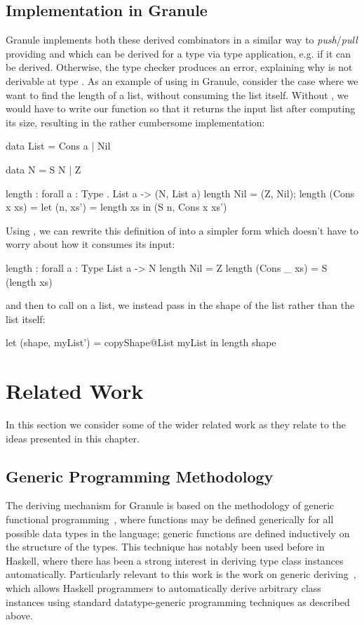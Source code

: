 \subsection{Implementation in Granule}
Granule implements both these derived combinators in a similar way to
\emph{push}/\emph{pull} providing  and  which can
be derived for a type  via type application, e.g.  if it can be derived. Otherwise, the type checker produces an error,
explaining why  is not derivable at type . As an example
of using  in Granule, consider the case where we want to find
the length of a list, without consuming the list itself. Without , 
we would have to write our  function so that it returns the input list
after computing its size, resulting in the rather cumbersome implementation:
\begin{granule}
data List = Cons a | Nil 

data N = S N | Z

length : forall { a : Type } . List a -> (N, List a)
length Nil = (Z, Nil);
length (Cons x xs) = 
  let (n, xs') = length xs in (S n, Cons x xs')
\end{granule}
Using , we can rewrite this definition of  into
a simpler form which doesn't have to worry about how it consumes its input:
\begin{granule}
length : forall { a : Type } List a -> N
length Nil = Z
length (Cons _ xs) = S (length xs)
\end{granule}
and then to call  on a list, we instead pass in the shape of the 
list rather than the list itself:
\begin{granule}
let (shape, myList') = copyShape@List myList in length shape
\end{granule}

\section{Related Work}
\label{sec:deriving-related}
In this section we consider some of the wider related work as they relate to the
ideas presented in this chapter.
\subsection{Generic Programming Methodology}
The deriving mechanism for Granule is based on the methodology of generic
functional programming~\citep{hinze2000new}, where functions may be defined
generically for all possible data types in the language; generic functions are
defined inductively on the structure of the types. This technique has notably
been used before in Haskell, where there has been a strong interest in deriving
type class instances automatically. Particularly relevant to this work is the
work on generic deriving~\citep{generic-deriving}, which allows Haskell
programmers to automatically derive arbitrary class instances using standard
datatype-generic programming techniques as described above. 


